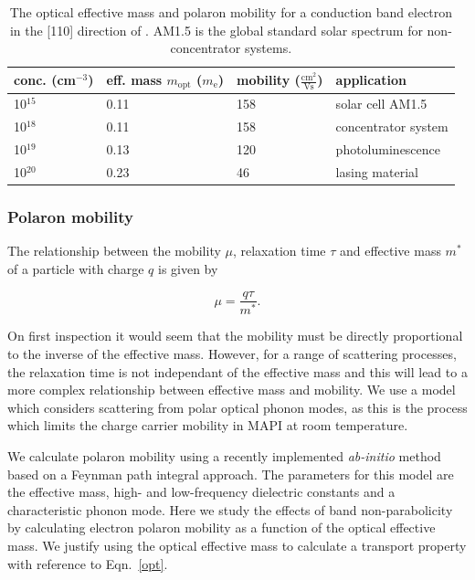 \begin{table} \centering
\caption[Electron effective mass and polaron mobility at various carrier concentrations]{\label{masstable} The optical effective mass and polaron mobility for a conduction band electron in the [110] direction of . AM1.5 is the global standard solar spectrum for non-concentrator systems.}
\begin{tabular}{p{3.5cm}p{3.5cm}p{3.5cm}p{4cm}}
\toprule
conc. (cm$^{-3}$) & eff. mass $m_\text{opt}$ ($m_\text{e}$) & mobility ($\frac{\text{cm}^2}{\text{Vs}}$) & application \\
\midrule
10$^{15}$ & 0.11 & 158 & solar cell AM1.5\\
10$^{18}$ & 0.11 & 158 & concentrator system \\
10$^{19}$ & 0.13 & 120 & photoluminescence\\
10$^{20}$ & 0.23 & 46 & lasing material \\
\bottomrule
\end{tabular}
\end{table}


\subsubsection{Polaron mobility} \label{ch4:mobility}

The relationship between the mobility $\mu$, relaxation time $\tau$ and effective mass $m^*$ of a particle with charge $q$ is given by

\begin{equation}
\mu = \frac{q\tau}{m^*}.
\end{equation}

On first inspection it would seem that the mobility must be directly proportional to the inverse of the effective mass. 
However, for a range of scattering processes, the relaxation time is not independant of the effective mass and this will lead to a more complex relationship between effective mass and mobility.
We use a model which considers scattering from polar optical phonon modes,
as this is the process which limits the charge carrier mobility in MAPI at room temperature.\autocite{Wright2016}

We calculate polaron mobility using a recently implemented \textit{ab-initio} method based on a Feynman path integral approach.\autocite{Frost2017b}
The parameters for this model are the effective mass, high- and low-frequency dielectric constants and a characteristic phonon mode.
Here we study the effects of band non-parabolicity by calculating electron polaron mobility as a function of the optical effective mass. 
We justify using the optical effective mass to calculate a transport property with reference to Eqn.\ \ref{opt}.

